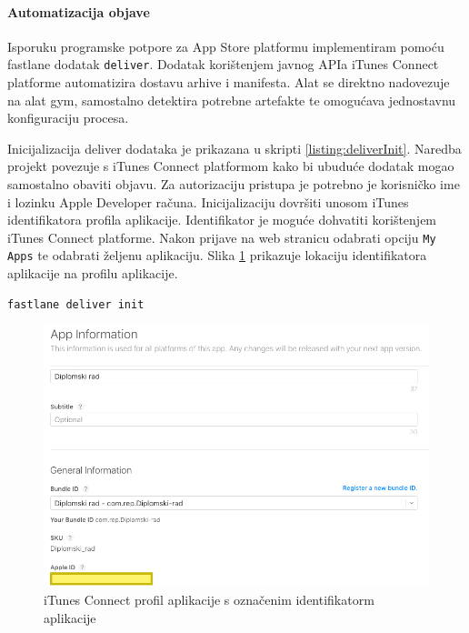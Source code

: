 \documentclass[times, utf8, diplomski, numeric]{fer}
\begin{document}
\paragraph{Automatizacija objave}

Isporuku programske potpore za App Store platformu implementiram pomoću fastlane dodatak \verb|deliver|\citep{fastlane:deliver}. Dodatak korištenjem javnog APIa iTunes Connect platforme automatizira dostavu arhive i manifesta. Alat se direktno nadovezuje na alat gym, samostalno detektira potrebne artefakte te omogućava jednostavnu konfiguraciju procesa.

Inicijalizacija deliver dodataka je prikazana u skripti \ref{listing:deliverInit}. Naredba projekt povezuje s iTunes Connect platformom kako bi ubuduće dodatak mogao samostalno obaviti objavu. Za autorizaciju pristupa je potrebno je korisničko ime i lozinku Apple Developer računa. Inicijalizaciju dovršiti unosom iTunes identifikatora profila aplikacije. Identifikator je moguće dohvatiti korištenjem iTunes Connect platforme. Nakon prijave na web stranicu  odabrati opciju \verb|My Apps| te odabrati željenu aplikaciju. Slika \ref{fig:iTunesConnectAppId} prikazuje lokaciju identifikatora aplikacije na profilu aplikacije.

\begin{lstlisting}[caption=Inicijalizacija deliver dodatka, label=listing:deliverInit]
fastlane deliver init
\end{lstlisting}

\begin{figure}
\centering
\includegraphics[scale=0.45]{iTunesConnectAppId}
\caption{iTunes Connect profil aplikacije s označenim identifikatorm aplikacije}
\label{fig:iTunesConnectAppId}
\end{figure}
\end{document}
